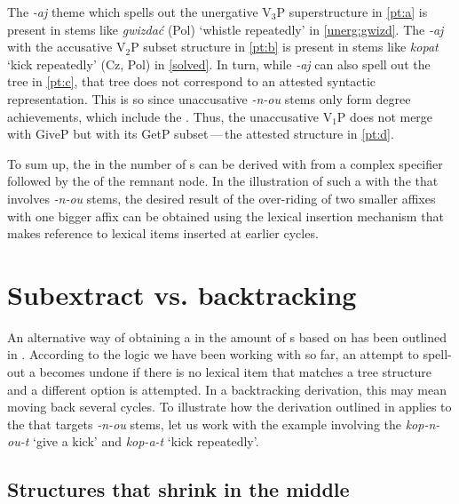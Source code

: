 \noindent
The \textit{-aj} theme  which spells out the unergative V$_{3}$P superstructure in \ref{pt:a} is present in stems like \textit{gwizda\'c} (Pol) `whistle repeatedly' in \ref{unerg:gwizd}. The \textit{-aj} with the accusative V$_{2}$P subset structure in \ref{pt:b} is present in stems like \textit{kopat} `kick repeatedly' (Cz, Pol) in \ref{solved}. 
In turn, while \textit{-aj} can also spell out the tree in \ref{pt:c}, that tree does not correspond to an attested syntactic representation. This is so since unaccusative \textit{-n-ou} stems only form degree achievements, which include the . Thus, the unaccusative V$_{1}$P does not merge with GiveP but with its GetP subset\,---\,the attested structure in \ref{pt:d}.
\par
To sum up, the  in the number of s can be derived with  from a complex specifier followed by the  of the remnant node. In the illustration of such a  with the  that involves \textit{-n-ou} stems, the desired result of the over-riding of two smaller affixes  with one bigger affix can be obtained using the lexical insertion mechanism that makes reference to lexical items inserted at earlier cycles. 

\section{Subextract vs. backtracking}

An alternative way of obtaining a  in the amount of s based on  has been outlined in .  According to the  logic we have been working with so far, an attempt to spell-out a  becomes undone if there is no lexical item that matches a tree structure and a different  option is attempted. In a backtracking derivation, this may mean moving back several cycles. To illustrate how the  derivation outlined in  applies to the  that targets \textit{-n-ou} stems, let us work with the example involving the  \textit{kop-n-ou-t} `give a kick' and \textit{kop-a-t} `kick repeatedly'.

\subsection{Structures that shrink  in the middle}

